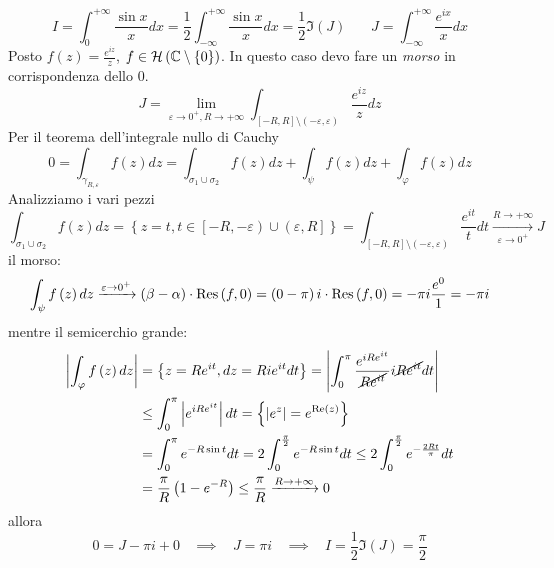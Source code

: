 \Soluzione
\begin{equation*}
I = \int^{+ \infty}_{0}\frac{\sin x}{x} dx = \frac{1}{2}\int^{+ \infty}_{- \infty}\frac{\sin x}{x} dx = \frac{1}{2}\Im \left(J\right) \ \ \ \ \ \ \ \ J = \int^{+ \infty}_{- \infty}\frac{e^{ix}}{x} dx
\end{equation*}
Posto $f\left(z\right) = \frac{e^{iz}}{z}$, $f\in \Hc \left(\CC  \setminus \left\{0\right\}\right)$. In questo caso devo fare un \textit{morso} in corrispondenza dello $0$.
\begin{equation*}
J = \lim_{\varepsilon \rightarrow 0^{+}, R\rightarrow + \infty}\int_{\left[ - R, R\right] \setminus \left(- \varepsilon, \varepsilon \right)}\frac{e^{iz}}{z} dz
\end{equation*}
Per il teorema dell'integrale nullo di Cauchy
\begin{equation*}
0 = \int_{\gamma_{R, \varepsilon}} f\left(z\right) dz = \int_{\sigma_{1} \cup \sigma_{2}} f\left(z\right) dz + \int_{\psi} f\left(z\right) dz + \int_{\varphi} f\left(z\right) dz
\end{equation*}
Analizziamo i vari pezzi
\begin{equation*}
\int_{\sigma_{1} \cup \sigma_{2}} f\left(z\right) dz = \left\{z = t, t\in \left[ - R, - \varepsilon \right) \cup \left(\varepsilon, R\right]\right\} = \int_{\left[ - R, R\right] \setminus \left(- \varepsilon, \varepsilon \right)}\frac{e^{it}}{t} dt\xrightarrow[\varepsilon \rightarrow 0^{+}]{R\rightarrow + \infty} J
\end{equation*}
il morso:
\begin{equation*}
\int_{\psi} f\left(z\right) dz\xrightarrow{\varepsilon \rightarrow 0^{+}}\left(\beta - \alpha \right) \cdot \Res \left(f, 0\right) = \left(0 - \pi \right) i \cdot \Res \left(f, 0\right) = - \pi i\frac{e^{0}}{1} = - \pi i
\end{equation*}
mentre il semicerchio grande:
\begin{align*}
\left| \int_{\varphi} f\left(z\right) dz\right|  & = \left\{z = Re^{it}, dz = Rie^{it} dt\right\} = \left| \int^{\pi}_{0}\frac{e^{iRe^{it}}}{\cancel{Re^{it}}} i\cancel{Re^{it}} dt\right| \\
 & \leq \int^{\pi}_{0}\left| e^{iRe^{it}}\right| dt = \left\{\left| e^{z}\right| = e^{\Re \left(z\right)}\right\}\\
 & = \int^{\pi}_{0} e^{- R\sin t} dt = 2\int^{\frac{\pi}{2}}_{0} e^{- R\sin t} dt \leq 2\int^{\frac{\pi}{2}}_{0} e^{- \frac{2Rt}{\pi}} dt\\
 & = \frac{\pi}{R}\left(1 - e^{- R}\right) \leq \frac{\pi}{R}\xrightarrow{R\rightarrow + \infty} 0
\end{align*}
allora
\begin{equation*}
0 = J - \pi i + 0\ \ \ \ \implies \ \ \ \ J = \pi i\ \ \ \ \implies \ \ \ \ I = \frac{1}{2}\Im \left(J\right) = \frac{\pi}{2}
\end{equation*}
\Soluzione

